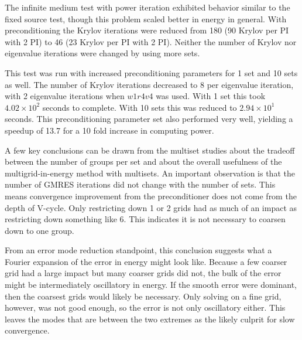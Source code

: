 The infinite medium test with power iteration exhibited behavior similar to the fixed source test, though this problem scaled better in energy in general. With preconditioning the Krylov iterations were reduced from 180 (90 Krylov per PI with 2 PI) to 46 (23 Krylov per PI with 2 PI). Neither the number of Krylov nor eigenvalue iterations were changed by using more sets.  

This test was run with increased preconditioning parameters for 1 set and 10 sets as well. The number of Krylov iterations decreased to 8 per eigenvalue iteration, with 2 eigenvalue iterations when $w1r4v4$ was used. With 1 set this took $4.02 \times 10^{2}$ seconds to complete. With 10 sets this was reduced to $2.94 \times 10^{1}$ seconds. This preconditioning parameter set also performed very well, yielding a speedup of 13.7 for a 10 fold increase in computing power.  
 
A few key conclusions can be drawn from the multiset studies about the tradeoff between the number of groups per set and about the overall usefulness of the multigrid-in-energy method with multisets. An important observation is that the number of GMRES iterations did not change with the number of sets. This means convergence improvement from the preconditioner does not come from the depth of V-cycle. Only restricting down 1 or 2 grids had as much of an impact as restricting down something like 6. This indicates it is not necessary to coarsen down to one group. 

From an error mode reduction standpoint, this conclusion suggests what a Fourier expansion of the error in energy might look like. Because a few coarser grid had a large impact but many coarser grids did not, the bulk of the error might be intermediately oscillatory in energy. If the smooth error were dominant, then the coarsest grids would likely be necessary. Only solving on a fine grid, however, was not good enough, so the error is not only oscillatory either. This leaves the modes that are between the two extremes as the likely culprit for slow convergence. 

